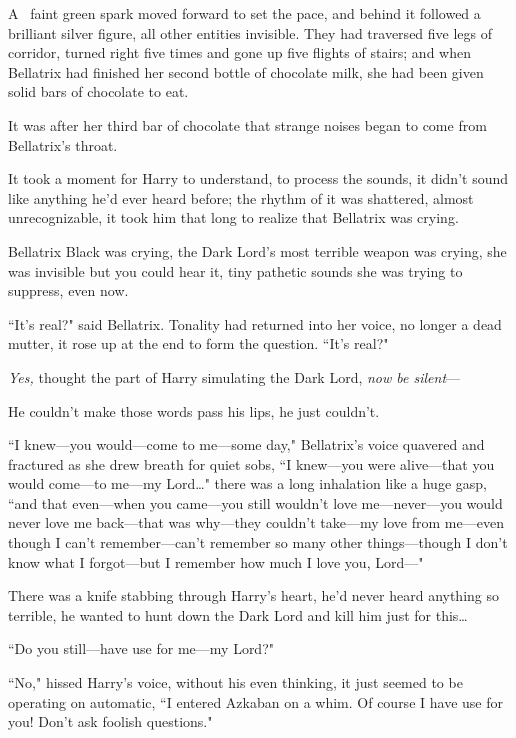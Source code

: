 
\lettrine{A}{~} faint green spark moved forward to set the pace, and behind it followed a brilliant silver figure, all other entities invisible. They had traversed five legs of corridor, turned right five times and gone up five flights of stairs; and when Bellatrix had finished her second bottle of chocolate milk, she had been given solid bars of chocolate to eat.

It was after her third bar of chocolate that strange noises began to come from Bellatrix's throat.

It took a moment for Harry to understand, to process the sounds, it didn't sound like anything he'd ever heard before; the rhythm of it was shattered, almost unrecognizable, it took him that long to realize that Bellatrix was crying.

Bellatrix Black was crying, the Dark Lord's most terrible weapon was crying, she was invisible but you could hear it, tiny pathetic sounds she was trying to suppress, even now.

``It's real?" said Bellatrix. Tonality had returned into her voice, no longer a dead mutter, it rose up at the end to form the question. ``It's real?"

\emph{Yes,} thought the part of Harry simulating the Dark Lord, \emph{now be silent}---

He couldn't make those words pass his lips, he just couldn't.

``I knew---you would---come to me---some day," Bellatrix's voice quavered and fractured as she drew breath for quiet sobs, ``I knew---you were alive---that you would come---to me---my Lord{\ldots}" there was a long inhalation like a huge gasp, ``and that even---when you came---you still wouldn't love me---never---you would never love me back---that was why---they couldn't take---my love from me---even though I can't remember---can't remember so many other things---though I don't know what I forgot---but I remember how much I love you, Lord---"

There was a knife stabbing through Harry's heart, he'd never heard anything so terrible, he wanted to hunt down the Dark Lord and kill him just for this{\ldots}

``Do you still---have use for me---my Lord?"

``No," hissed Harry's voice, without his even thinking, it just seemed to be operating on automatic, ``I entered Azkaban on a whim. Of course I have use for you! Don't ask foolish questions."

